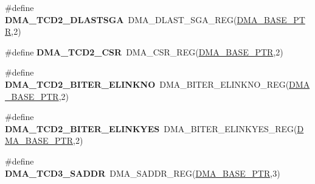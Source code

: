 \begin{DoxyCompactItemize}
\item 
\hypertarget{group___d_m_a___register___accessor___macros_ga03556e18fbd384f9629fc80815c370ac}{}\#define {\bfseries D\+M\+A\+\_\+\+T\+C\+D2\+\_\+\+D\+L\+A\+S\+T\+S\+G\+A}~D\+M\+A\+\_\+\+D\+L\+A\+S\+T\+\_\+\+S\+G\+A\+\_\+\+R\+E\+G(\hyperlink{group___d_m_a___peripheral_ga6997fbc1b1973e9f27170217a3bd6f22}{D\+M\+A\+\_\+\+B\+A\+S\+E\+\_\+\+P\+T\+R},2)\label{group___d_m_a___register___accessor___macros_ga03556e18fbd384f9629fc80815c370ac}

\item 
\hypertarget{group___d_m_a___register___accessor___macros_ga868475048617575cf190c20189c586ee}{}\#define {\bfseries D\+M\+A\+\_\+\+T\+C\+D2\+\_\+\+C\+S\+R}~D\+M\+A\+\_\+\+C\+S\+R\+\_\+\+R\+E\+G(\hyperlink{group___d_m_a___peripheral_ga6997fbc1b1973e9f27170217a3bd6f22}{D\+M\+A\+\_\+\+B\+A\+S\+E\+\_\+\+P\+T\+R},2)\label{group___d_m_a___register___accessor___macros_ga868475048617575cf190c20189c586ee}

\item 
\hypertarget{group___d_m_a___register___accessor___macros_gaa27b02c8585b159ffc7b78f32c3d7b2d}{}\#define {\bfseries D\+M\+A\+\_\+\+T\+C\+D2\+\_\+\+B\+I\+T\+E\+R\+\_\+\+E\+L\+I\+N\+K\+N\+O}~D\+M\+A\+\_\+\+B\+I\+T\+E\+R\+\_\+\+E\+L\+I\+N\+K\+N\+O\+\_\+\+R\+E\+G(\hyperlink{group___d_m_a___peripheral_ga6997fbc1b1973e9f27170217a3bd6f22}{D\+M\+A\+\_\+\+B\+A\+S\+E\+\_\+\+P\+T\+R},2)\label{group___d_m_a___register___accessor___macros_gaa27b02c8585b159ffc7b78f32c3d7b2d}

\item 
\hypertarget{group___d_m_a___register___accessor___macros_ga7105375c432e810701dc580bbe2c97f7}{}\#define {\bfseries D\+M\+A\+\_\+\+T\+C\+D2\+\_\+\+B\+I\+T\+E\+R\+\_\+\+E\+L\+I\+N\+K\+Y\+E\+S}~D\+M\+A\+\_\+\+B\+I\+T\+E\+R\+\_\+\+E\+L\+I\+N\+K\+Y\+E\+S\+\_\+\+R\+E\+G(\hyperlink{group___d_m_a___peripheral_ga6997fbc1b1973e9f27170217a3bd6f22}{D\+M\+A\+\_\+\+B\+A\+S\+E\+\_\+\+P\+T\+R},2)\label{group___d_m_a___register___accessor___macros_ga7105375c432e810701dc580bbe2c97f7}

\item 
\hypertarget{group___d_m_a___register___accessor___macros_gae015b1c8ea3e04489c82a43512f27ab1}{}\#define {\bfseries D\+M\+A\+\_\+\+T\+C\+D3\+\_\+\+S\+A\+D\+D\+R}~D\+M\+A\+\_\+\+S\+A\+D\+D\+R\+\_\+\+R\+E\+G(\hyperlink{group___d_m_a___peripheral_ga6997fbc1b1973e9f27170217a3bd6f22}{D\+M\+A\+\_\+\+B\+A\+S\+E\+\_\+\+P\+T\+R},3)\label{group___d_m_a___register___accessor___macros_gae015b1c8ea3e04489c82a43512f27ab1}


\end{DoxyCompactItemize}

